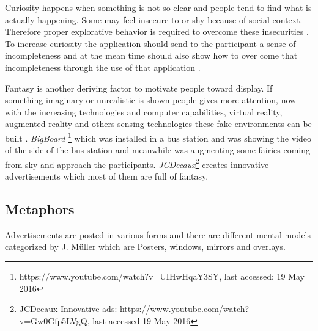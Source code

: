 Curiosity happens when something is not so clear and people tend to find what is actually happening. Some may feel insecure to or shy because of social context. Therefore proper explorative behavior is required to overcome these insecurities \cite{motiv}. To increase curiosity the application should send to the participant a sense of incompleteness and at the mean time should also show how to over come that incompleteness through the use of that application \cite{pervasiv_ad}.

Fantasy is another deriving factor to motivate people toward display. If something imaginary or unrealistic is shown people gives more attention, now with the increasing technologies and computer capabilities, virtual reality, augmented reality and others sensing technologies these fake environments can be built \cite{fantasy_metaphores}. \emph{BigBoard} \footnote{ https://www.youtube.com/watch?v=UIHwHqaY3SY, last accessed: 19 May 2016} which was installed in a bus station and was showing the video of the side of the bus station and meanwhile was augmenting some fairies coming from sky and approach the participants. \emph{JCDecaux}\footnote{JCDecaux Innovative ads: https://www.youtube.com/watch?v=Gw0Gfp5LVgQ, last accessed 19 May 2016} creates innovative advertisements which most of them are full of fantasy. 

 



\subsection{Metaphors}
Advertisements are posted in various forms and there are different mental models categorized by J. Müller \cite{DesignSpace} which are Posters, windows, mirrors and overlays.

